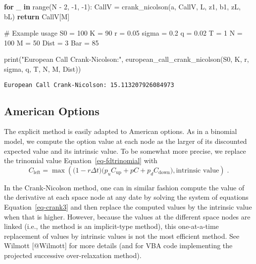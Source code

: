 \documentclass[
  letterpaper,
  DIV=11,
  numbers=noendperiod]{scrartcl}
\newenvironment{Shaded}{\begin{snugshade}}{\end{snugshade}}
\newcommand{\BuiltInTok}[1]{\textcolor[rgb]{0.00,0.23,0.31}{#1}}
\newcommand{\CommentTok}[1]{\textcolor[rgb]{0.37,0.37,0.37}{#1}}
\newcommand{\ControlFlowTok}[1]{\textcolor[rgb]{0.00,0.23,0.31}{\textbf{#1}}}
\newcommand{\DecValTok}[1]{\textcolor[rgb]{0.68,0.00,0.00}{#1}}
\newcommand{\FloatTok}[1]{\textcolor[rgb]{0.68,0.00,0.00}{#1}}
\newcommand{\KeywordTok}[1]{\textcolor[rgb]{0.00,0.23,0.31}{\textbf{#1}}}
\newcommand{\NormalTok}[1]{\textcolor[rgb]{0.00,0.23,0.31}{#1}}
\newcommand{\OperatorTok}[1]{\textcolor[rgb]{0.37,0.37,0.37}{#1}}
\newcommand{\StringTok}[1]{\textcolor[rgb]{0.13,0.47,0.30}{#1}}
\theoremstyle{definition}
\theoremstyle{remark}
\begin{document}
\begin{Shaded}
\begin{Highlighting}[]
    \ControlFlowTok{for}\NormalTok{ \_ }\KeywordTok{in} \BuiltInTok{range}\NormalTok{(N }\OperatorTok{{-}} \DecValTok{2}\NormalTok{, }\OperatorTok{{-}}\DecValTok{1}\NormalTok{, }\OperatorTok{{-}}\DecValTok{1}\NormalTok{):}
\NormalTok{        CallV }\OperatorTok{=}\NormalTok{ crank\_nicolson(a, CallV, L, z1, b1, zL, bL)}
    \ControlFlowTok{return}\NormalTok{ CallV[M]}

\CommentTok{\# Example usage}
\NormalTok{S0 }\OperatorTok{=} \DecValTok{100}
\NormalTok{K }\OperatorTok{=} \DecValTok{90}
\NormalTok{r }\OperatorTok{=} \FloatTok{0.05}
\NormalTok{sigma }\OperatorTok{=} \FloatTok{0.2}
\NormalTok{q }\OperatorTok{=} \FloatTok{0.02}
\NormalTok{T }\OperatorTok{=} \DecValTok{1}
\NormalTok{N }\OperatorTok{=} \DecValTok{100}
\NormalTok{M }\OperatorTok{=} \DecValTok{50}
\NormalTok{Dist }\OperatorTok{=} \DecValTok{3}
\NormalTok{Bar }\OperatorTok{=} \DecValTok{85}

\BuiltInTok{print}\NormalTok{(}\StringTok{"European Call Crank{-}Nicolson:"}\NormalTok{, european\_call\_crank\_nicolson(S0, K, r, sigma, q, T, N, M, Dist))}
\end{Highlighting}
\end{Shaded}

\begin{verbatim}
European Call Crank-Nicolson: 15.113207926084973
\end{verbatim}

\subsection{American Options}\label{american-options}

The explicit method is easily adapted to American options. As in a
binomial model, we compute the option value at each node as the larger
of its discounted expected value and its intrinsic value. To be somewhat
more precise, we replace the trinomial value
Equation~\ref{eq-fdtrinomial} with \[
C_{\text{left}} = \max\left(\big(1-r\Delta t\big)\big(p_uC_{\text{up}}+pC + p_dC_{\text{down}}\big), \text{intrinsic value}\right)\;.
\]

In the Crank-Nicolson method, one can in similar fashion compute the
value of the derivative at each space node at any date by solving the
system of equations Equation~\ref{eq-crank3} and then replace the
computed values by the intrinsic value when that is higher. However,
because the values at the different space nodes are linked (i.e., the
method is an implicit-type method), this one-at-a-time replacement of
values by intrinsic values is not the most efficient method. See Wilmott
{[}@Wilmott{]} for more details (and for VBA code implementing the
projected successive over-relaxation method).
\end{document}
